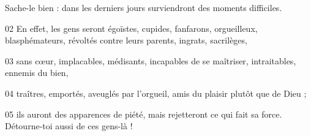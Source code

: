 Sache-le bien : dans les derniers jours surviendront des moments difficiles.

02 En effet, les gens seront égoïstes, cupides, fanfarons, orgueilleux, blasphémateurs, révoltés contre leurs parents, ingrats, sacrilèges,

03 sans cœur, implacables, médisants, incapables de se maîtriser, intraitables, ennemis du bien,

04 traîtres, emportés, aveuglés par l’orgueil, amis du plaisir plutôt que de Dieu ;

05 ils auront des apparences de piété, mais rejetteront ce qui fait sa force. Détourne-toi aussi de ces gens-là !

